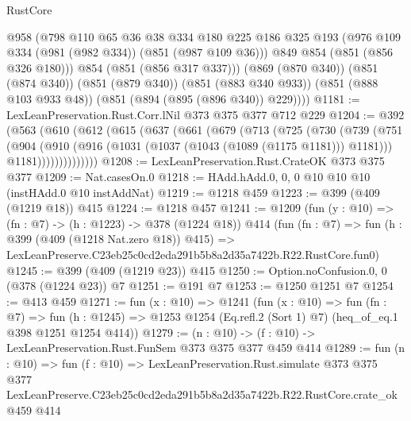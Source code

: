 \begin{lexlean}{RustCore}
\begin{coremodule}
          @958
          (@798
            @110
            @65
            @36
            @38
            @334
            @180
            @225
            @186
            @325
            @193
            (@976 @109 @334 (@981 (@982 @334)) (@851 (@987 @109 @36)))
            @849
            @854
            (@851 (@856 @326 @180)))
          @854
          (@851 (@856 @317 @337)))
        (@869 (@870 @340))
        (@851 (@874 @340))
        (@851 (@879 @340))
        (@851 (@883 @340 @933))
        (@851 (@888 @103 @933 @48))
        (@851 (@894 (@895 (@896 @340)) @229))))
@1181 := LexLeanPreservation.Rust.Corr.lNil @373 @375 @377 @712 @229
@1204 := @392
    (@563
      (@610
        (@612
          (@615
            (@637
              (@661
                (@679
                  (@713
                    (@725
                      (@730
                        (@739
                          (@751
                            (@904
                              (@910
                                (@916 (@1031 (@1037 (@1043 (@1089 (@1175 @1181))) @1181)))
                                @1181))))))))))))))
@1208 := LexLeanPreservation.Rust.CrateOK @373 @375 @377
@1209 := Nat.casesOn.{0}
@1218 := HAdd.hAdd.{0, 0, 0} @10 @10 @10 (instHAdd.{0} @10 instAddNat)
@1219 := @1218 @459
@1223 := @399 (@409 (@1219 @18)) @415
@1224 := @1218 @457
@1241 := @1209
    (fun (y : @10) => (fn : @7) -> (h : @1223) -> @378 (@1224 @18))
    @414
    (fun (fn : @7) =>
    fun (h : @399 (@409 (@1218 Nat.zero @18)) @415) =>
    LexLeanPreserve.C23eb25c0cd2eda291b5b8a2d35a7422b.R22.RustCore.fun0)
@1245 := @399 (@409 (@1219 @23)) @415
@1250 := Option.noConfusion.{0, 0} (@378 (@1224 @23)) @7
@1251 := @191 @7
@1253 := @1250 @1251 @7
@1254 := @413 @459
@1271 := fun (x : @10) =>
  @1241
    (fun (x : @10) =>
    fun (fn : @7) =>
    fun (h : @1245) => @1253 @1254 (Eq.refl.{2} (Sort 1) @7) (heq_of_eq.{1} @398 @1251 @1254 @414))
@1279 := (n : @10) -> (f : @10) -> LexLeanPreservation.Rust.FunSem @373 @375 @377 @459 @414
@1289 := fun (n : @10) =>
  fun (f : @10) =>
  LexLeanPreservation.Rust.simulate
    @373
    @375
    @377
    LexLeanPreserve.C23eb25c0cd2eda291b5b8a2d35a7422b.R22.RustCore.crate_ok
    @459
    @414
\end{coremodule}
\end{lexlean}
